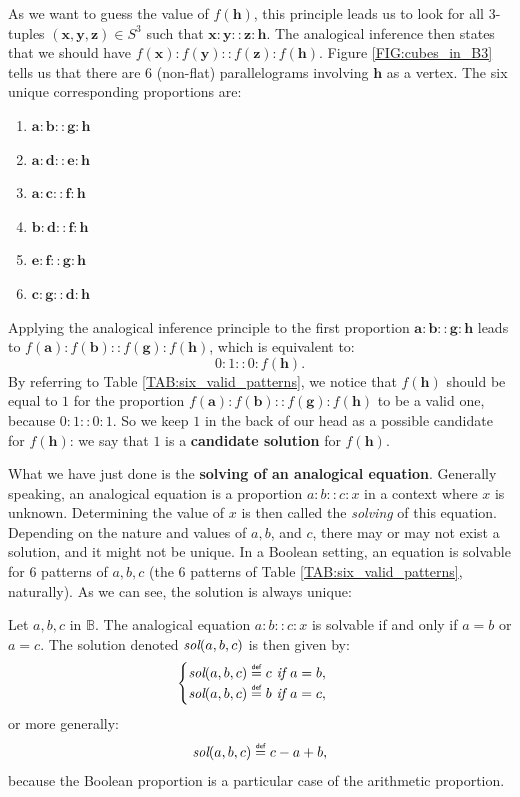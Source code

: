 As we want to guess the value of $f(\mathbf{h})$, this principle leads us to
look for all 3-tuples $(\mathbf{x}, \mathbf{y}, \mathbf{z}) \in S^3$ such that
$\mathbf{x}:\mathbf{y}::\mathbf{z}:\mathbf{h}$.  The analogical inference then
states that we should have
$f(\mathbf{x}):f(\mathbf{y})::f(\mathbf{z}):f(\mathbf{h})$. Figure
\ref{FIG:cubes_in_B3} tells us that there are 6 (non-flat) parallelograms
involving $\mathbf{h}$ as a vertex. The six unique corresponding proportions
are:

\begin{enumerate}
  \item $\mathbf{a} : \mathbf{b} :: \mathbf{g} : \mathbf{h}$
  \item $\mathbf{a} : \mathbf{d} :: \mathbf{e} : \mathbf{h}$
  \item $\mathbf{a} : \mathbf{c} :: \mathbf{f} : \mathbf{h}$
  \item $\mathbf{b} : \mathbf{d} :: \mathbf{f} : \mathbf{h}$
  \item $\mathbf{e} : \mathbf{f} :: \mathbf{g} : \mathbf{h}$
  \item $\mathbf{c} : \mathbf{g} :: \mathbf{d} : \mathbf{h}$
\end{enumerate}

Applying the analogical inference principle to the first proportion $\mathbf{a}
: \mathbf{b} :: \mathbf{g} : \mathbf{h}$ leads to $f(\mathbf{a}) :
f(\mathbf{b}) :: f(\mathbf{g}) : f(\mathbf{h})$, which is equivalent to:
$$0:1::0:f(\mathbf{h}).$$ By referring to Table \ref{TAB:six_valid_patterns}, we
notice that $f(\mathbf{h})$ should be equal to $1$ for the proportion
$f(\mathbf{a}) : f(\mathbf{b}) :: f(\mathbf{g}) : f(\mathbf{h})$ to be a valid
one, because $0:1::0:1$. So we keep $1$ in the back of our head as a possible
candidate for $f(\mathbf{h})$: we say that $1$ is a \textbf{candidate
solution} for $f(\mathbf{h})$.

What we have just done is the \textbf{solving of an analogical equation}.
Generally speaking, an analogical equation is a proportion $a:b::c:x$ in a
context where $x$ is unknown. Determining the value of $x$ is then called the
\textit{solving} of this equation. Depending on the nature and values of $a, b$,
and $c$, there may or may not exist a solution, and it might not be unique. In a
Boolean setting, an equation is solvable for 6 patterns of $a, b, c$ (the 6
patterns of Table \ref{TAB:six_valid_patterns}, naturally). As we can see, the
solution is always unique:

\begin{proposition}
  \label{PROPOS:equation_solving}
  Let $a, b, c$ in $\mathbb{B}$. The analogical equation
  $a :b::c:x$
  is solvable if and only if $a = b$ or $a = c$. The solution denoted
  $\emph{sol}(a, b, c)$ is then given by:
  $$
  \begin{cases}
    \emph{sol}(a, b, c) \eqdef c \emph{ if } a = b,\\
    \emph{sol}(a, b, c) \eqdef b \emph{ if } a = c,
  \end{cases}
  $$
  or more generally:
  $$\emph{sol}(a, b, c) \eqdef c - a + b,$$
  because the Boolean proportion is a particular case of the arithmetic
  proportion.
\end{proposition}

